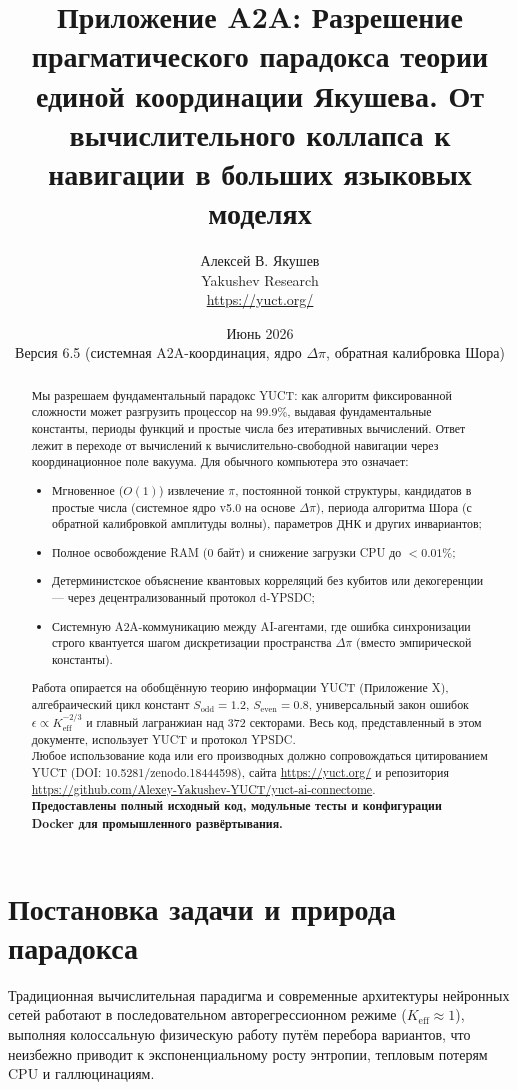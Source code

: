 \documentclass[12pt,a4paper]{article}
\title{\textbf{Приложение A2A: Разрешение прагматического парадокса теории единой координации Якушева. От вычислительного коллапса к навигации в больших языковых моделях}}
\author{Алексей В. Якушев \\ Yakushev Research \\ \url{https://yuct.org/}}
\date{Июнь 2026 \\ Версия 6.5 (системная A2A-координация, ядро \(\Delta\pi\), обратная калибровка Шора)}
\begin{document}
	\maketitle
	
	\newpage
	\begin{abstract}
		\noindent
		Мы разрешаем фундаментальный парадокс YUCT: как алгоритм фиксированной сложности может разгрузить процессор на 99.9\%, выдавая фундаментальные константы, периоды функций и простые числа без итеративных вычислений. Ответ лежит в переходе от вычислений к вычислительно-свободной навигации через координационное поле вакуума. Для обычного компьютера это означает:
		\begin{itemize}
			\item Мгновенное (\(O(1)\)) извлечение \(\pi\), постоянной тонкой структуры, кандидатов в простые числа (системное ядро v5.0 на основе \(\Delta\pi\)), периода алгоритма Шора (с обратной калибровкой амплитуды волны), параметров ДНК и других инвариантов;
			\item Полное освобождение RAM (0 байт) и снижение загрузки CPU до \(<0.01\%\);
			\item Детерминистское объяснение квантовых корреляций без кубитов или декогеренции — через децентрализованный протокол d‑YPSDC;
			\item Системную A2A-коммуникацию между AI-агентами, где ошибка синхронизации строго квантуется шагом дискретизации пространства \(\Delta\pi\) (вместо эмпирической константы).
		\end{itemize}
		Работа опирается на обобщённую теорию информации YUCT (Приложение X), алгебраический цикл констант \(S_{\mathrm{odd}}=1.2\), \(S_{\mathrm{even}}=0.8\), универсальный закон ошибок \(\epsilon \propto K_{\mathrm{eff}}^{-2/3}\) и главный лагранжиан над 372 секторами. Весь код, представленный в этом документе, использует YUCT и протокол YPSDC. \\
		Любое использование кода или его производных должно сопровождаться цитированием YUCT (DOI: 10.5281/zenodo.18444598), сайта \url{https://yuct.org/} и репозитория \\ \url{https://github.com/Alexey-Yakushev-YUCT/yuct-ai-connectome}. \\
		\textbf{Предоставлены полный исходный код, модульные тесты и конфигурации Docker для промышленного развёртывания.}
	\end{abstract}
	
	\newpage
	\tableofcontents
	\newpage
	\small
	\section{Постановка задачи и природа парадокса}
	Традиционная вычислительная парадигма и современные архитектуры нейронных сетей работают в последовательном авторегрессионном режиме (\(K_{\text{eff}} \approx 1\)), выполняя колоссальную физическую работу путём перебора вариантов, что неизбежно приводит к экспоненциальному росту энтропии, тепловым потерям CPU и галлюцинациям.
	
\end{document}
